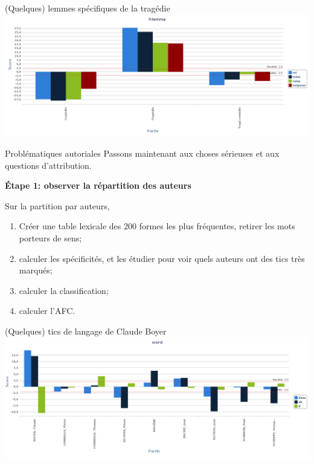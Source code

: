 \documentclass{beamer}
\begin{document}
\begin{frame}{(Quelques) lemmes spécifiques de la tragédie}
	\includegraphics[width=\textwidth]{img/Graphique_genre_frlemma_specif.png}
\end{frame}


\begin{frame}{Problématiques autoriales}
	Passons maintenant aux choses sérieuses et aux questions d'attribution.
	
	\textbf{Étape 1: observer la répartition des auteurs}
	
	Sur la partition par auteurs,
	\begin{enumerate}
		\item Créer une table lexicale des 200 formes les plus fréquentes, retirer les mots porteurs de sens;
		\item calculer les spécificités, et les étudier pour voir quels auteurs ont des tics très marqués;
		\item calculer la classification;
		\item calculer l'AFC.
	\end{enumerate}
	
\end{frame}

\begin{frame}{(Quelques) tics de langage de Claude Boyer}
\includegraphics[width=\textwidth]{img/Graphique_word_parAuteurs_specif.png}
\end{frame}
\end{document}
